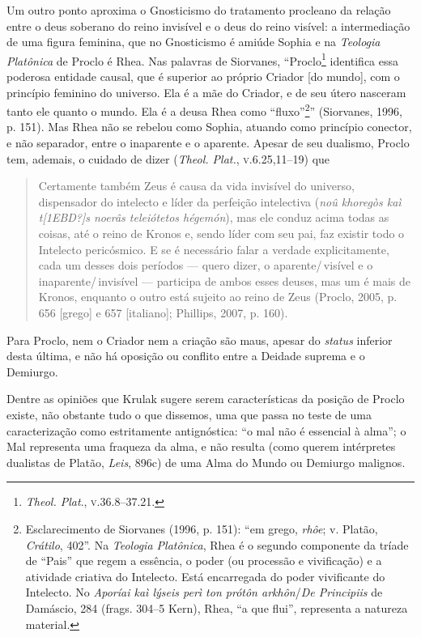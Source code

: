 Um outro ponto aproxima o Gnosticismo do tratamento procleano
da relação entre o deus soberano do reino invisível e o deus do
reino visível: a intermediação de uma figura feminina, que no
Gnosticismo é amiúde Sophia e na \emph{Teologia Platônica} de
Proclo é Rhea. Nas palavras de Siorvanes, “Proclo\footnote{
\emph{Theol. Plat}., \textsc{v}.36.8--37.21.} identifica essa poderosa
entidade causal, que é superior ao próprio Criador [do mundo],
com o princípio feminino do universo. Ela é a mãe do Criador, e
de seu útero nasceram tanto ele quanto o mundo. Ela é a deusa
Rhea como ``fluxo''\footnote{ Esclarecimento de Siorvanes (1996,
p. 151): “em grego, \emph{rhôe}; v. Platão, \emph{Crátilo},
402”. Na \emph{Teologia Platônica}, Rhea é o segundo
componente da tríade de “Pais” que regem a essência, o poder (ou
processão e vivificação) e a atividade criativa do Intelecto.
Está encarregada do poder vivificante do Intelecto. No
\emph{Aporíai kaì lýseis perì t}\emph{o}\emph{n
pr}\emph{ó}\emph{t}\emph{ô}\emph{n
arkh}\emph{ô}\emph{n}/\emph{De Principiis} de Damáscio,
284 (frags. 304--5 Kern), Rhea, “a que flui”, representa a
natureza material.}” (Siorvanes, 1996, p. 151). Mas Rhea não se
rebelou como Sophia, atuando como princípio conector, e não
separador, entre o inaparente e o aparente. Apesar de seu
dualismo, Proclo tem, ademais, o cuidado de dizer
(\emph{Theol. Plat.}, \textsc{v}.6.25,11--19) que 

\begin{quote}
Certamente também Zeus é causa da vida invisível do universo,
dispensador do intelecto e líder da perfeição intelectiva
(\emph{noû khoregòs kaì t[1EBD?]s no}\emph{e}\emph{râs
t}\emph{e}\emph{l}\emph{e}\emph{iótetos
hégem}\emph{ó}\emph{n}), mas ele conduz acima todas as
coisas, até o reino de Kronos e, sendo líder com seu pai, faz
existir todo o Intelecto pericósmico. E se é necessário falar a
verdade explicitamente, cada um desses dois períodos --- quero
dizer, o aparente/\,visível e o inaparente/\,invisível --- participa
de ambos esses deuses, mas um é mais de Kronos, enquanto o outro
está sujeito ao reino de Zeus (Proclo, 2005, p. 656 [grego] e
657 [italiano]; Phillips, 2007, p. 160).
\end{quote}

Para Proclo, nem o Criador nem a criação são maus, apesar do
\emph{status} inferior desta última, e não há oposição ou
conflito entre a Deidade suprema e o Demiurgo.

Dentre as opiniões que Krulak sugere serem características da
posição de Proclo existe, não obstante tudo o que dissemos, uma
que passa no teste de uma caracterização como estritamente
antignóstica: “o mal não é essencial à alma”; o Mal representa
uma fraqueza da alma, e não resulta (como querem intérpretes
dualistas de Platão, \emph{Leis}, 896c) de uma Alma do Mundo
ou Demiurgo malignos. 

